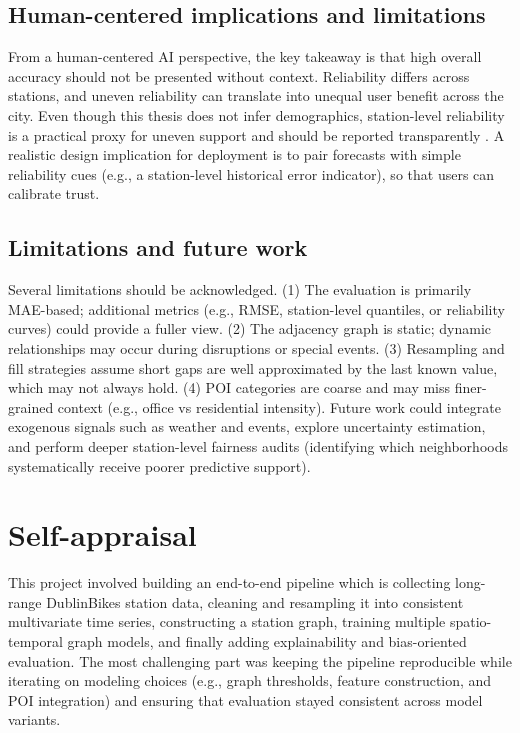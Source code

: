 \documentclass[11pt]{report}
\begin{document}
\subsection{Human-centered implications and limitations}
From a human-centered AI perspective, the key takeaway is that high overall accuracy should not be presented without context. Reliability differs across stations, and uneven reliability can translate into unequal user benefit across the city. Even though this thesis does not infer demographics, station-level reliability is a practical proxy for uneven support and should be reported transparently \cite{yan2020fairness,zheng2021equality}. A realistic design implication for deployment is to pair forecasts with simple reliability cues (e.g., a station-level historical error indicator), so that users can calibrate trust.

\subsection{Limitations and future work}
Several limitations should be acknowledged. (1) The evaluation is primarily MAE-based; additional metrics (e.g., RMSE, station-level quantiles, or reliability curves) could provide a fuller view. (2) The adjacency graph is static; dynamic relationships may occur during disruptions or special events. (3) Resampling and fill strategies assume short gaps are well approximated by the last known value, which may not always hold. (4) POI categories are coarse and may miss finer-grained context (e.g., office vs residential intensity). Future work could integrate exogenous signals such as weather and events, explore uncertainty estimation, and perform deeper station-level fairness audits (identifying which neighborhoods systematically receive poorer predictive support).

\section{Self-appraisal}
This project involved building an end-to-end pipeline which is collecting long-range DublinBikes station data, cleaning and resampling it into consistent multivariate time series, constructing a station graph, training multiple spatio-temporal graph models, and finally adding explainability and bias-oriented evaluation. The most challenging part was keeping the pipeline reproducible while iterating on modeling choices (e.g., graph thresholds, feature construction, and POI integration) and ensuring that evaluation stayed consistent across model variants.
\end{document}
